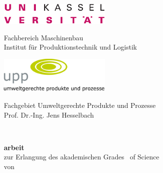\thispagestyle{empty}
\begin{center}
    \vspace*{-0.2cm}
	\begin{minipage}[c]{6cm}
		\includegraphics[width=5.5cm]{gfx/logo_universitaet_CMYK.pdf} \\ \vspace*{1cm} 
	\end{minipage}
	\hfill
	\begin{minipage}[c]{10cm}
		Fachbereich Maschinenbau  \\
		Institut für Produktionstechnik und Logistik \\	\vspace*{1cm}
	\end{minipage}

	\begin{minipage}[c]{6cm}
		\includegraphics[width=5.5cm]{gfx/Logo_upp.pdf} \\
	\end{minipage}
	\hfill
	\begin{minipage}[c]{10cm}
		Fachgebiet Umweltgerechte Produkte und Prozesse \\
		Prof. Dr.-Ing. Jens Hesselbach\\
	\end{minipage}
    \vspace*{1.5cm}
\end{center}
	
\begin{spacing}{2.5}
		{\textbf{\Large\thesistitle}} \\
		{\textbf{\thesissubtitle}}    
\end{spacing}
\vspace{2.5cm}
		
\begin{spacing}{2.5}
		{\textbf{\thesistype arbeit}}\\
		{zur Erlangung des akademischen Grades \thesistype\ of Science}\\
		{von}\\
		{\vornamenachname}\\
\end{spacing}
	\abgabedatum


